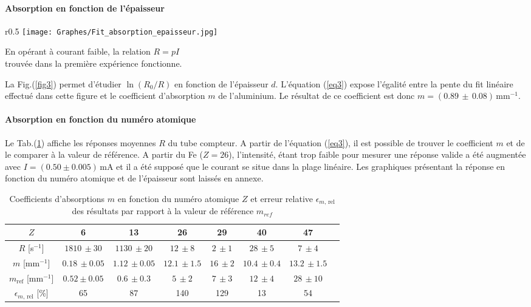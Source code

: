 \documentclass[a4paper, 12pt,oneside]{article}
\begin{document}
\paragraph{Absorption en fonction de l'épaisseur}
\begin{wrapfigure}{r}{0.5\textwidth}
\vspace{-2cm}%
    \centering  %
    \texttt{[image: Graphes/Fit\_absorption\_epaisseur.jpg]}
    \captionsetup{justification=centering}
    \caption{Graphe du logarithme de $R_0/R$ en fonction de l'épaisseur $d$ de la plaque et fit linéaire de pente $m=(0.89\,\pm\,0.08)$\,mm$^{-1}$.}
    \label{fig3}
    \vspace{-1.11cm}
\end{wrapfigure}
En opérant à courant faible, la relation $R=pI$\\ trouvée dans la première expérience fonctionne.

 La Fig.(\ref{fig3}) permet d'étudier $\ln(R_0/R)$ en fonction de l'épaisseur $d$. L'équation (\ref{eq3}) expose l'égalité entre la pente du fit linéaire effectué dans cette figure et le coefficient d'absorption $m$ de l'aluminium. Le résultat de ce coefficient est donc $m=(0.89\,\pm\,0.08)$\,mm$^{-1}$.
\vspace{-0.25cm}
\paragraph{Absorption en fonction du numéro atomique}
Le Tab.(\ref{tab3}) affiche les réponses moyennes $R$ du tube compteur. A partir de l'équation (\ref{eq3}), il est possible de trouver le coefficient $m$ et de le comparer à la valeur de référence. A partir du Fe ($Z = 26$), l'intensité, étant trop faible pour mesurer une réponse valide a été augmentée avec $I=(0.50\pm0.005)$\,mA et il a été supposé que le courant se situe dans la plage linéaire. Les graphiques présentant la réponse en fonction du numéro atomique et de l'épaisseur sont laissés en annexe.

\begin{table}[h]
\begin{tabular}{|c||c|c|c|c|c|c|c|}
\hline
$Z$ & 6 & 13 & 26 & 29 & 40 & 47 \\
\hline
$R$ [s$^{-1}$] & $1810\,\pm 30$ & $1130\,\pm 20$ & $12\,\pm 8$ & $2\,\pm 1$& $28\,\pm 5$ & $7\,\pm 4$ \\
\hline
$m$ [mm$^{-1}$] & $0.18\,\pm 0.05$ & $1.12\,\pm 0.05$ & $12.1\,\pm 1.5$ & $16\,\pm 2$ & $10.4\,\pm 0.4$& $13.2\,\pm 1.5$ \\
\hline
$m_{\text{ref}}$ [mm$^{-1}$]& $0.52\pm 0.05$ & $0.6\,\pm 0.3$& $5\,\pm 2$& $7\,\pm 3$& $12\,\pm 4$& $28\,\pm 10$\\
\hline
$\epsilon_{m\text{, rel}}$ [\%]&65&87&140&129&13&54\\
\hline
\end{tabular}
\captionsetup{justification=centering}
\caption{Coefficients d'absorptions $m$ en fonction du numéro atomique $Z$ et erreur relative $\epsilon_{m\text{, rel}}$ des résultats par rapport à la valeur de référence $m_{ref}$}
\label{tab3}
\end{table}
\vspace{-0.4cm}
\end{document}
